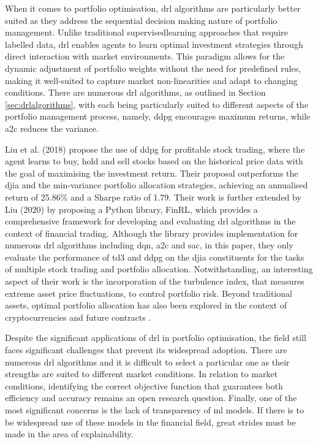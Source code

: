 When it comes to portfolio optimisation, \acrshort{drl} algorithms are particularly better suited as they address the sequential decision making nature of portfolio management. Unlike traditional \Gls{supervisedlearning} approaches that require labelled data, \acrshort{drl} enables agents to learn optimal investment strategies through direct interaction with market environments. This paradigm allows for the dynamic adjustment of portfolio weights without the need for predefined rules, making it well-suited to capture market non-linearities and adapt to changing conditions. There are numerous \acrshort{drl} algorithms, as outlined in Section \ref{sec:drlalgorithms}, with each being particularly suited to different aspects of the portfolio management process, namely, \acrshort{ddpg} encourages maximum returns, while \acrshort{a2c} reduces the variance. 

Liu et al. (2018) \cite{Liu2018} propose the use of \acrshort{ddpg} for profitable stock trading, where the agent learns to buy, hold and sell stocks based on the historical price data with the goal of maximising the investment return. Their proposal outperforms the \acrfull{djia} and the min-variance portfolio allocation strategies, achieving an annualised return of 25.86\% and a Sharpe ratio of 1.79. Their work is further extended by Liu (2020) \cite{Liu2020} by proposing a Python library, FinRL, which provides a comprehensive framework for developing and evaluating \acrshort{drl} algorithms in the context of financial trading. Although the library provides implementation for numerous \acrshort{drl} algorithms including \acrshort{dqn}, \acrshort{a2c} and \acrshort{sac}, in this paper, they only evaluate the performance of \acrshort{td3} and \acrshort{ddpg} on the \acrfull{djia} constituents for the tasks of multiple stock trading and portfolio allocation. Notwithstanding, an interesting aspect of their work is the incorporation of the turbulence index, that measures extreme asset price fluctuations, to control portfolio risk. Beyond traditional assets, optimal portfolio allocation has also been explored in the context of cryptocurrencies \cite{Jiang2016} and future contracts \cite{Zhang2019}.

Despite the significant applications of \acrshort{drl} in portfolio optimisation, the field still faces significant challenges that prevent its widespread adoption. There are numerous \acrshort{drl} algorithms and it is difficult to select a particular one as their strengths are suited to different market conditions. In relation to market conditions, identifying the correct objective function that guarantees both efficiency and accuracy remains an open research question. Finally, one of the most significant concerns is the lack of transparency of \acrshort{ml} models. If there is to be widespread use of these models in the financial field, great strides must be made in the area of explainability.

